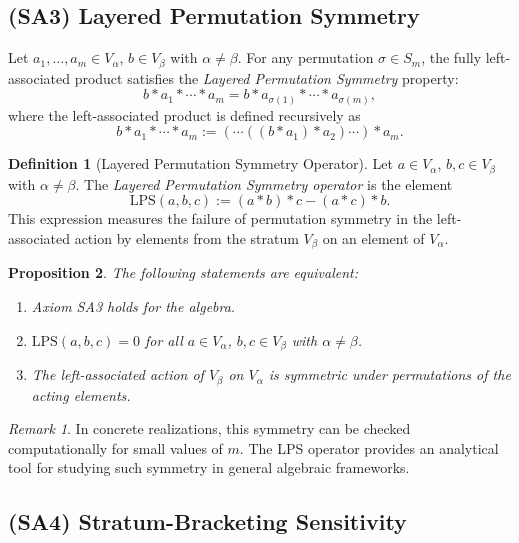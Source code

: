 \documentclass[12pt]{article}
\theoremstyle{definition}
\newtheorem{definition}{Definition}[section]
\theoremstyle{plain}
\newtheorem{proposition}[definition]{Proposition}
\theoremstyle{remark}
\newtheorem*{remark}{Remark}
\begin{document}
\subsection*{(SA3) Layered Permutation Symmetry}

Let \( a_1, \ldots, a_m \in V_\alpha \), \( b \in V_\beta \) with \( \alpha \ne \beta \). For any permutation \( \sigma \in S_m \), the fully left-associated product satisfies the \emph{Layered Permutation Symmetry} property:
\[
b * a_1 * \cdots * a_m = b * a_{\sigma(1)} * \cdots * a_{\sigma(m)},
\]
where the left-associated product is defined recursively as
\[
b * a_1 * \cdots * a_m := (\cdots((b * a_1) * a_2) \cdots ) * a_m.
\]

\begin{definition}[Layered Permutation Symmetry Operator]
Let \( a \in V_\alpha \), \( b, c \in V_\beta \) with \( \alpha \ne \beta \). The \emph{Layered Permutation Symmetry operator} is the element
\[
\mathrm{LPS}(a,b,c) := (a * b) * c - (a * c) * b.
\]
This expression measures the failure of permutation symmetry in the left-associated action by elements from the stratum \( V_\beta \) on an element of \( V_\alpha \).
\end{definition}

\begin{proposition}
The following statements are equivalent:
\begin{enumerate}
\item Axiom SA3 holds for the algebra.
\item \(\mathrm{LPS}(a,b,c) = 0\) for all \( a \in V_\alpha \), \( b, c \in V_\beta \) with \( \alpha \ne \beta \).
\item The left-associated action of \( V_\beta \) on \( V_\alpha \) is symmetric under permutations of the acting elements.
\end{enumerate}
\end{proposition}

\begin{remark}
In concrete realizations, this symmetry can be checked computationally for small values of \( m \). The LPS operator provides an analytical tool for studying such symmetry in general algebraic frameworks.
\end{remark}

\subsection*{(SA4) Stratum-Bracketing Sensitivity}
\end{document}
